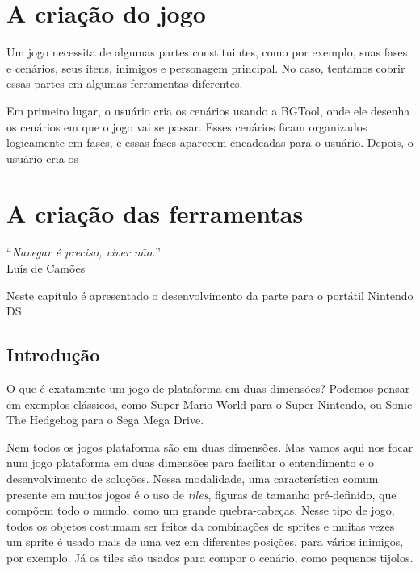 \documentclass[brazil]{abnt}
\begin{document}
\chapter{A criação do jogo\label{workflow}}

Um jogo necessita de algumas partes constituintes, como por exemplo, suas fases e cenários, seus ítens, inimigos e personagem principal. No caso, tentamos cobrir essas partes em algumas ferramentas diferentes.

Em primeiro lugar, o usuário cria os cenários usando a BGTool, onde ele desenha os cenários em que o jogo vai se passar. Esses cenários ficam organizados logicamente em fases, e essas fases aparecem encadeadas para o usuário.
Depois, o usuário cria os 

\chapter{A criação das ferramentas\label{cap:engine}}

\vfill{}
\begin{flushright}{}``\emph{Navegar é preciso, viver não.}''\\
{\small Luís de Camões}\end{flushright}{\small \par}
\vfill{}

Neste capítulo é apresentado o desenvolvimento da parte para o portátil Nintendo DS.
\newpage


\section{Introdução}

O que é exatamente um jogo de plataforma em duas dimensões? Podemos pensar em exemplos clássicos, como Super Mario World para o Super Nintendo, ou Sonic The Hedgehog para o Sega Mega Drive.

Nem todos os jogos plataforma são em duas dimensões. Mas vamos aqui nos focar num jogo plataforma em duas dimensões para facilitar o entendimento e o desenvolvimento de soluções. Nessa modalidade, uma característica comum presente em muitos jogos é o uso de \textit{tiles}, figuras de tamanho pré-definido, que compõem todo o mundo, como um grande quebra-cabeças. Nesse tipo de jogo, todos os objetos costumam ser feitos da combinações de sprites e muitas vezes um sprite é usado mais de uma vez em diferentes posições, para vários inimigos, por exemplo. Já os tiles são usados para compor o cenário, como pequenos tijolos.
\end{document}
